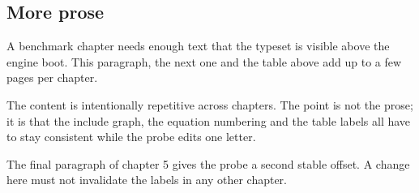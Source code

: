 \subsection{More prose}
A benchmark chapter needs enough text that the type\-set is visible above the
engine boot. This paragraph, the next one and the table above add up to a few
pages per chapter.

The content is intentionally repetitive across chapters. The point is not the
prose; it is that the include graph, the equation numbering and the table
labels all have to stay consistent while the probe edits one letter.

The final paragraph of chapter 5 gives the probe a second stable offset. A
change here must not invalidate the labels in any other chapter.
